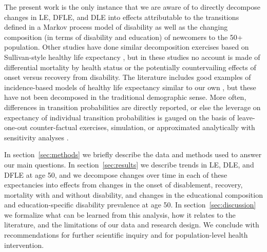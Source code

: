 The present work is the only instance that we are aware of to directly decompose changes in LE, DFLE, and DLE into effects attributable to the transitions defined in a Markov process model of disability as well as the changing composition (in terms of disability and education) of newcomers to the 50+ population. Other studies have done similar decomposition exercises based on Sullivan-style healthy life expectancy \citep[e.g.,][]{andreev2003health, nusselder2005contribution, van2011contribution, heijink2011decomposing, van2013gender, freedman2016disability, chernew2016understanding}, but in these studies no account is made of differential mortality by health status or the potentially countervailing effects of onset versus recovery from disability. The literature includes good examples of incidence-based models of healthy life expectancy similar to our own \citep[e.g.,][]{crimmins2009change, reuser2011higher, montez2014cumulative}, but these have not been decomposed in the traditional demographic sense. More often, differences in transition probabilities are directly reported, or else the leverage on expectancy of individual transition probabilities is gauged on the basis of leave-one-out counter-factual exercises, simulation, or approximated analytically with sensitivity analyses \citep{reuser2010effect}.

In section~\ref{sec:methods} we briefly describe the data and methods used to answer our main questions. In section~\ref{sec:results} we describe trends in LE, DLE, and DFLE at age 50, and we decompose changes over time in each of these expectancies into effects from changes in the onset of disablement, recovery, mortality with and without disability, and changes in the educational composition and education-specific disability prevalence at age 50. In section~\ref{sec:discussion} we formalize what can be learned from this analysis, how it relates to the literature, and the limitations of our data and research design. We conclude with recommendations for further scientific inquiry and for population-level health intervention.

